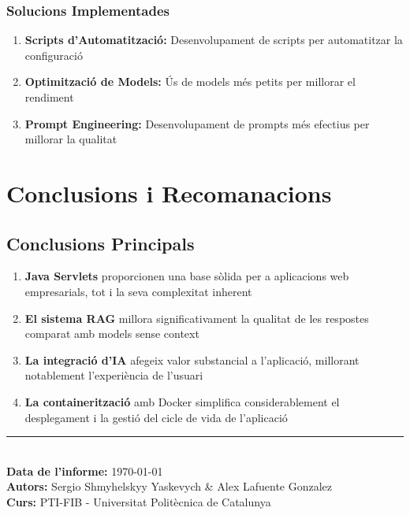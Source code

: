\documentclass[12pt,a4paper]{article}
\begin{document}
\subsubsection{Solucions Implementades}

\begin{enumerate}
    \item \textbf{Scripts d'Automatització:} Desenvolupament de scripts per automatitzar la configuració
    \item \textbf{Optimització de Models:} Ús de models més petits per millorar el rendiment
    \item \textbf{Prompt Engineering:} Desenvolupament de prompts més efectius per millorar la qualitat
\end{enumerate}

\section{Conclusions i Recomanacions}

\subsection{Conclusions Principals}

\begin{enumerate}
    \item \textbf{Java Servlets} proporcionen una base sòlida per a aplicacions web empresarials, tot i la seva complexitat inherent
    \item \textbf{El sistema RAG} millora significativament la qualitat de les respostes comparat amb models sense context
    \item \textbf{La integració d'IA} afegeix valor substancial a l'aplicació, millorant notablement l'experiència de l'usuari
    \item \textbf{La containerització} amb Docker simplifica considerablement el desplegament i la gestió del cicle de vida de l'aplicació
\end{enumerate}

\begin{center}
\rule{0.8\textwidth}{0.4pt}\\
\vspace{0.5cm}
\textbf{Data de l'informe:} \today\\
\textbf{Autors:} Sergio Shmyhelskyy Yaskevych \& Alex Lafuente Gonzalez\\
\textbf{Curs:} PTI-FIB - Universitat Politècnica de Catalunya
\end{center}
\end{document}
